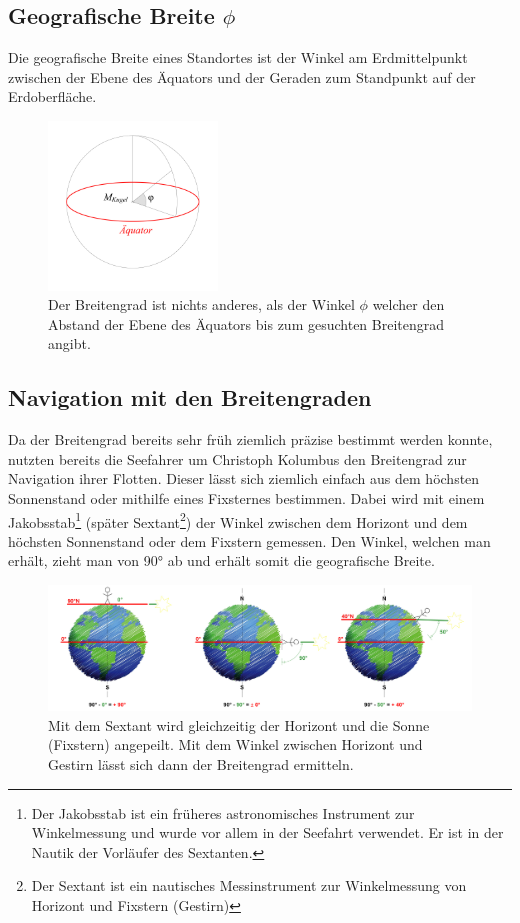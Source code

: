 \begin{refsection}
\subsection{Geografische Breite $\phi$}
\begin{definition}
Die geografische Breite eines Standortes ist der Winkel am
Erdmittelpunkt zwischen der Ebene des Äquators und der Geraden zum
Standpunkt auf der Erdoberfläche.
\end{definition}

\begin{figure}[hbtp]
\centering
\includegraphics[width=0.4\textwidth]{kugel/GeografischeBreite.jpg}
\caption{Der Breitengrad ist nichts anderes, als der Winkel $\phi$
welcher den Abstand der Ebene des Äquators bis zum gesuchten
Breitengrad angibt.}
\end{figure}

\subsection{Navigation mit den Breitengraden}  \label{BreitengradM}
Da der Breitengrad bereits sehr früh ziemlich präzise bestimmt
werden konnte, nutzten bereits die Seefahrer um Christoph Kolumbus
den Breitengrad zur Navigation ihrer Flotten.
Dieser lässt sich ziemlich einfach aus dem höchsten Sonnenstand
oder mithilfe eines Fixsternes bestimmen. Dabei wird mit einem
Jakobsstab\footnote{%
Der Jakobsstab ist ein früheres astronomisches Instrument zur
Winkelmessung und wurde vor allem in der Seefahrt verwendet. Er ist
in der Nautik der Vorläufer des Sextanten.} (später Sextant\footnote{%
Der Sextant ist ein nautisches Messinstrument zur Winkelmessung von
Horizont und Fixstern (Gestirn)}) der Winkel zwischen dem Horizont
und dem höchsten Sonnenstand oder dem Fixstern gemessen. Den Winkel,
welchen man erhält, zieht man von 90° ab und erhält somit die
geografische Breite.

\begin{figure}[htbp]
\centering
\includegraphics[width=1\textwidth]{kugel/Breitengrad.jpg}
\caption{Mit dem Sextant wird gleichzeitig der Horizont und die
Sonne (Fixstern) angepeilt. Mit dem Winkel zwischen Horizont und
Gestirn lässt sich dann der Breitengrad ermitteln.}
\end{figure}


\end{refsection}
